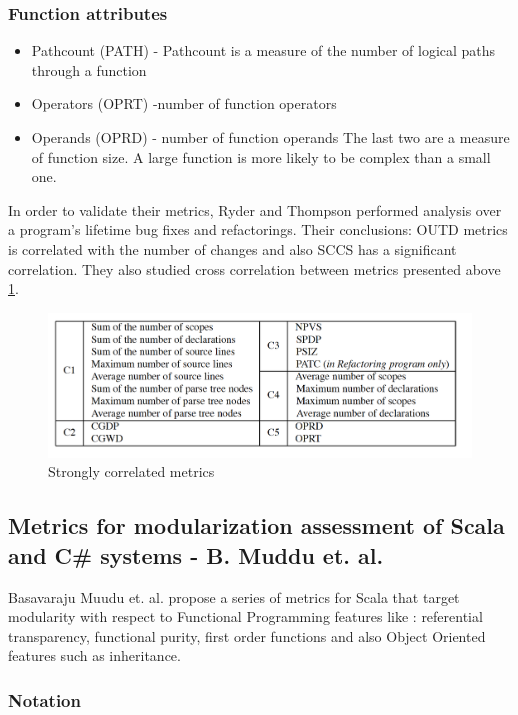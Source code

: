 \documentclass{article}
\begin{document}
\subsubsection{Function attributes}
\begin{itemize}
\item Pathcount (PATH) - Pathcount is a measure of the number of logical paths through a function
\item Operators (OPRT) -number of function operators
\item Operands (OPRD) - number of function operands \newline 
The last two are a measure of function size. A large function is more likely to be complex than a small one.
\end{itemize}

In order to validate their metrics, Ryder and Thompson performed analysis over a program's lifetime bug fixes and refactorings. Their conclusions: OUTD metrics is correlated with the number of changes and also SCCS has a significant correlation. They also studied cross correlation between metrics presented above \ref{fig:cross-correlation}.

\begin{figure}[h!]
  \includegraphics[width=\linewidth]{cross-correlation.png}
  \caption{Strongly correlated metrics  \cite{eps250597}}
  \label{fig:cross-correlation}
\end{figure}

\subsection{Metrics for modularization assessment of Scala and C\# systems - B. Muddu et. al.}
Basavaraju Muudu et. al. \cite{DBLP:conf/icse/MudduABP13} propose a series of metrics for Scala that target modularity with respect to Functional Programming features like : referential transparency, functional purity, first order functions and also Object Oriented features such as inheritance.


\subsubsection{Notation}
\end{document}
